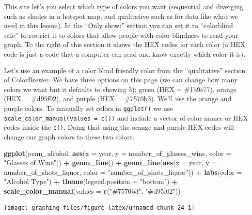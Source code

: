 \documentclass[
  12pt,
]{book}
\newenvironment{Shaded}{\begin{snugshade}}{\end{snugshade}}
\newcommand{\DataTypeTok}[1]{\textcolor[rgb]{0.13,0.29,0.53}{#1}}
\newcommand{\KeywordTok}[1]{\textcolor[rgb]{0.13,0.29,0.53}{\textbf{#1}}}
\newcommand{\NormalTok}[1]{#1}
\newcommand{\OperatorTok}[1]{\textcolor[rgb]{0.81,0.36,0.00}{\textbf{#1}}}
\newcommand{\StringTok}[1]{\textcolor[rgb]{0.31,0.60,0.02}{#1}}
\begin{document}
This site let's you select which type of colors you want (sequential and diverging such as shades in a hotspot map, and qualitative such as for data like what we used in this lesson). In the ``Only show:'' section you can set it to ``colorblind safe'' to restrict it to colors that allow people with color blindness to read your graph. To the right of this section it shows the HEX codes for each color (a HEX code is just a code that a computer can read and know exactly which color it is).

Let's use an example of a color blind friendly color from the ``qualitative'' section of ColorBrewer. We have three options on this page (we can change how many colors we want but it defaults to showing 3): green (HEX = \#1b9e77), orange (HEX = \#d95f02), and purple (HEX = \#7570b3). We'll use the orange and purple colors. To manually set colors in \texttt{ggplot()} we use \texttt{scale\_color\_manual(values\ =\ c())} and include a vector of color names or HEX codes inside the \texttt{c()}. Doing that using the orange and purple HEX codes will change our graph colors to these two colors.

\begin{Shaded}
\begin{Highlighting}[]
\KeywordTok{ggplot}\NormalTok{(penn\_alcohol, }\KeywordTok{aes}\NormalTok{(}\DataTypeTok{x =}\NormalTok{ year, }\DataTypeTok{y =}\NormalTok{ number\_of\_glasses\_wine,}
                         \DataTypeTok{color =} \StringTok{"Glasses of Wine"}\NormalTok{)) }\OperatorTok{+}
\StringTok{  }\KeywordTok{geom\_line}\NormalTok{() }\OperatorTok{+}
\StringTok{  }\KeywordTok{geom\_line}\NormalTok{(}\KeywordTok{aes}\NormalTok{(}\DataTypeTok{x =}\NormalTok{ year, }\DataTypeTok{y =}\NormalTok{ number\_of\_shots\_liquor,}
                \DataTypeTok{color =} \StringTok{"number\_of\_shots\_liquor"}\NormalTok{)) }\OperatorTok{+}
\StringTok{  }\KeywordTok{labs}\NormalTok{(}\DataTypeTok{color =} \StringTok{"Alcohol Type"}\NormalTok{) }\OperatorTok{+}
\StringTok{  }\KeywordTok{theme}\NormalTok{(}\DataTypeTok{legend.position =} \StringTok{"bottom"}\NormalTok{) }\OperatorTok{+}
\StringTok{  }\KeywordTok{scale\_color\_manual}\NormalTok{(}\DataTypeTok{values =} \KeywordTok{c}\NormalTok{(}\StringTok{"\#7570b3"}\NormalTok{, }\StringTok{"\#d95f02"}\NormalTok{))}
\end{Highlighting}
\end{Shaded}

\begin{center}\texttt{[image: graphing\_files/figure-latex/unnamed-chunk-24-1]} \end{center}
\end{document}
